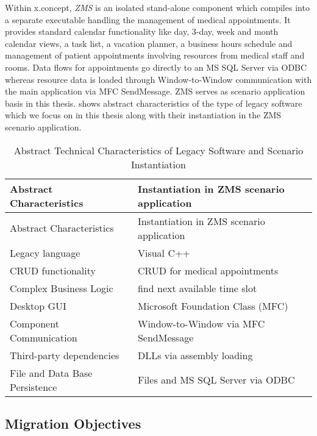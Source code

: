 Within x.concept, \emph{ZMS} is an isolated stand-alone component which compiles into a separate executable handling the management of medical appointments.
It provides standard calendar functionality like day, 3-day, week and month calendar views, a task list, a vacation planner, a business hours schedule and management of patient appointments involving resources from medical staff and rooms.
Data flows for appointments go directly to an MS SQL Server via ODBC whereas resource data is loaded through Window-to-Window communication with the main application via MFC SendMessage.
ZMS serves as scenario application basis in this thesis.
 shows abstract characteristics of the type of legacy software which we focus on in this thesis along with their instantiation in the ZMS scenario application.

\hypertarget{tbl:legacy_characteristics}{}
\begin{longtable}[]{@{}ll@{}}
\caption{\label{tbl:legacy_characteristics}Abstract Technical Characteristics of Legacy Software and Scenario Instantiation \autocite[adapted from][]{Heil2018ReWaMP}}\tabularnewline
\toprule
Abstract Characteristics & Instantiation in ZMS scenario application\tabularnewline
\midrule
\endfirsthead
\toprule
Abstract Characteristics & Instantiation in ZMS scenario application\tabularnewline
\midrule
\endhead
Legacy language & Visual C++\tabularnewline
CRUD functionality & CRUD for medical appointments\tabularnewline
Complex Business Logic & find next available time slot\tabularnewline
Desktop GUI & Microsoft Foundation Class (MFC)\tabularnewline
Component Communication & Window-to-Window via MFC SendMessage\tabularnewline
Third-party dependencies & DLLs via assembly loading\tabularnewline
File and Data Base Persistence & Files and MS SQL Server via ODBC\tabularnewline
\bottomrule
\end{longtable}

\hypertarget{migration-objectives}{%
\subsection{Migration Objectives}\label{migration-objectives}}

